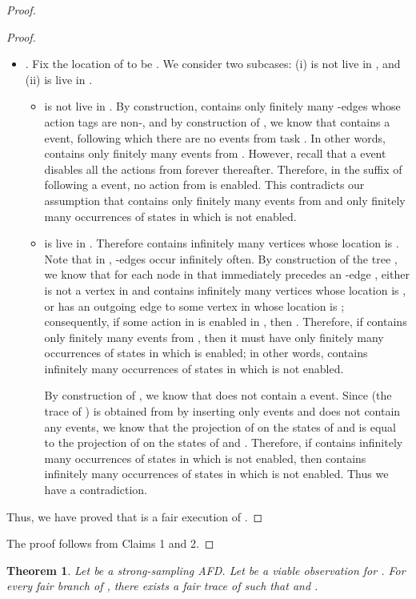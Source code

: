 \documentclass[11pt]{article}
\newtheorem{theorem}{Theorem}
\numberwithin{theorem}{section}
\begin{document}
\begin{proof}
\begin{proof}
\begin{itemize}
\item  . Fix the location of  to be . We consider two subcases: (i)  is not live in , and (ii)  is live in .
  \begin{itemize}
  \item  is not live in . By construction,  contains only finitely many -edges whose action tags are non-, and by construction of , we know that  contains a  event, following which there are no events from task . In other words,  contains only finitely many events from . However, recall that a  event disables all the actions from  forever thereafter. Therefore, in the suffix of  following a  event, no action from  is enabled. This contradicts our assumption that     contains only finitely many events from  and only finitely many occurrences of states in which  is not enabled.
  
  \item  is live in . Therefore  contains infinitely many vertices whose location is . Note that in , -edges occur infinitely often. By construction of the tree , we know that for each node  in  that immediately precedes an -edge , either  is not a vertex in  and  contains infinitely many vertices whose location is , or  has an outgoing edge to some vertex in  whose location is ; consequently, if some action in  is enabled in , then . Therefore, if  contains only finitely many events from , then it must have only finitely many occurrences of states in which  is enabled; in other words,  contains infinitely many occurrences of states in which  is not enabled. 
  
  By construction of , we know that  does not contain a  event. Since  (the trace of ) is obtained from  by inserting only  events and  does not contain any  events, we know that the projection of  on the states of  and  is equal to the projection of  on the states of  and . Therefore, if  contains infinitely many occurrences of states in which  is not enabled, then  contains infinitely many occurrences of states in which  is not enabled. Thus we have a contradiction.
  \end{itemize}
\end{itemize} 
Thus, we have proved that  is a fair execution of .
\end{proof}

The proof follows from Claims 1 and 2.
\end{proof}


\begin{theorem}\label{thm:fairBranchFairExec}
Let  be a strong-sampling AFD. Let  be a viable observation for .
For every fair branch  of , there exists a fair
trace  of  such that  and .
\end{theorem}
\end{document}
